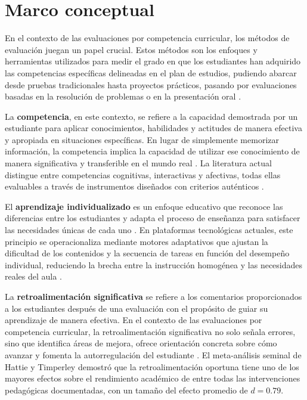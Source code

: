 
\section{Marco conceptual}

En el contexto de las evaluaciones por competencia curricular, los métodos de evaluación juegan un papel crucial. Estos métodos son los enfoques y herramientas utilizados para medir el grado en que los estudiantes han adquirido las competencias específicas delineadas en el plan de estudios, pudiendo abarcar desde pruebas tradicionales hasta proyectos prácticos, pasando por evaluaciones basadas en la resolución de problemas o en la presentación oral \cite{black1998inside,voinea2025competency}.

La \textbf{competencia}, en este contexto, se refiere a la capacidad demostrada por un estudiante para aplicar conocimientos, habilidades y actitudes de manera efectiva y apropiada en situaciones específicas. En lugar de simplemente memorizar información, la competencia implica la capacidad de utilizar ese conocimiento de manera significativa y transferible en el mundo real \cite{oecd2019compass}. La literatura actual distingue entre competencias cognitivas, interactivas y afectivas, todas ellas evaluables a través de instrumentos diseñados con criterios auténticos \cite{voinea2025competency}.

El \textbf{aprendizaje individualizado} es un enfoque educativo que reconoce las diferencias entre los estudiantes y adapta el proceso de enseñanza para satisfacer las necesidades únicas de cada uno \cite{sayed2023adaptive}. En plataformas tecnológicas actuales, este principio se operacionaliza mediante motores adaptativos que ajustan la dificultad de los contenidos y la secuencia de tareas en función del desempeño individual, reduciendo la brecha entre la instrucción homogénea y las necesidades reales del aula \cite{evans2020cbe}.

La \textbf{retroalimentación significativa} se refiere a los comentarios proporcionados a los estudiantes después de una evaluación con el propósito de guiar su aprendizaje de manera efectiva. En el contexto de las evaluaciones por competencia curricular, la retroalimentación significativa no solo señala errores, sino que identifica áreas de mejora, ofrece orientación concreta sobre cómo avanzar y fomenta la autorregulación del estudiante \cite{hattie2007feedback}. El meta-análisis seminal de Hattie y Timperley \cite{hattie2007feedback} demostró que la retroalimentación oportuna tiene uno de los mayores efectos sobre el rendimiento académico de entre todas las intervenciones pedagógicas documentadas, con un tamaño del efecto promedio de $d = 0.79$.

